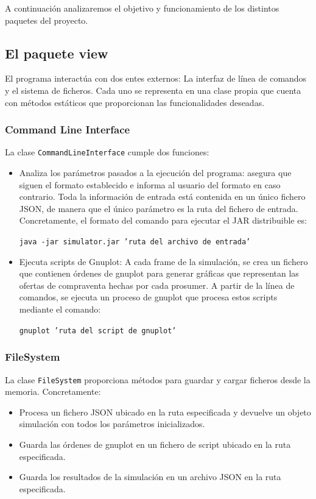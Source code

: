 \documentclass[12pt,a4paper,openright,oneside]{article}
\numberwithin{equation}{section}
\theoremstyle{definition}
\begin{document}
A continuación analizaremos el objetivo y funcionamiento de los distintos paquetes del proyecto.

\subsection{El paquete view}
El programa interactúa con dos entes externos: La interfaz de línea de comandos y el sistema de ficheros. Cada uno se representa en una clase propia que cuenta con métodos estáticos que proporcionan las funcionalidades deseadas. 

\subsubsection{Command Line Interface}
La clase \texttt{CommandLineInterface} cumple dos funciones:

\begin{itemize}
\item Analiza los parámetros pasados a la ejecución del programa: asegura que siguen el formato establecido e informa al usuario del formato en caso contrario. Toda la información de entrada está contenida en un único fichero JSON, de manera que el único parámetro es la ruta del fichero de entrada. Concretamente, el formato del comando para ejecutar el JAR distribuible es:

\texttt{java -jar simulator.jar 'ruta del archivo de entrada'}

\item Ejecuta scripts de Gnuplot: A cada frame de la simulación, se crea un fichero que contienen órdenes de gnuplot para generar gráficas que representan las ofertas de compraventa hechas por cada prosumer. A partir de la línea de comandos, se ejecuta un proceso de gnuplot que procesa estos scripts mediante el comando:

\texttt{gnuplot 'ruta del script de gnuplot'}

\end{itemize}

\subsubsection{FileSystem}
La clase \texttt{FileSystem} proporciona métodos para guardar y cargar ficheros desde la memoria. Concretamente:

\begin{itemize}
\item Procesa un fichero JSON ubicado en la ruta especificada y devuelve un objeto simulación con todos los parámetros inicializados.
\item Guarda las órdenes de gnuplot en un fichero de script ubicado en la ruta especificada. 
\item Guarda los resultados de la simulación en un archivo JSON en la ruta especificada.
\end{itemize}
\end{document}
